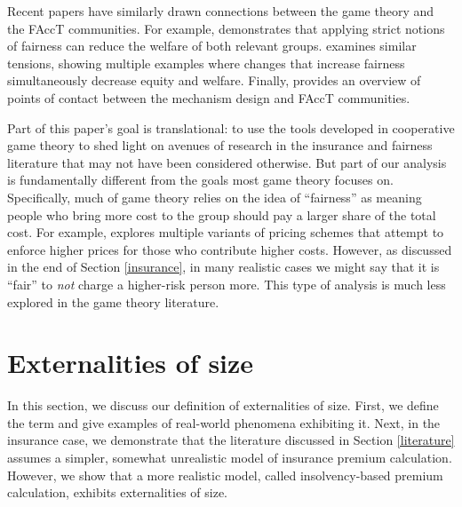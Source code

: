 \documentclass[sigconf]{acmart}
\begin{document}
Recent papers have similarly drawn connections between the game theory and the FAccT communities. For example, \citet{hu2020fair} demonstrates that applying strict notions of fairness can reduce the welfare of both relevant groups. \citet{kasy2020fairness} examines similar tensions, showing multiple examples where changes that increase fairness simultaneously decrease equity and welfare. Finally, \citet{finocchiarofairness} provides an overview of points of contact between the mechanism design and FAccT communities. 

Part of this paper's goal is translational: to use the tools developed in cooperative game theory to shed light on avenues of research in the insurance and fairness literature that may not have been considered otherwise. But part of our analysis is fundamentally different from the goals most game theory focuses on. Specifically, much of game theory relies on the idea of \enquote{fairness} as meaning people who bring more cost to the group should pay a larger share of the total cost. For example, \citet{elastic} explores multiple variants of pricing schemes that attempt to enforce higher prices for those who contribute higher costs. However, as discussed in the end of Section \ref{insurance}, in many realistic cases we might say that it is \enquote{fair} to \emph{not} charge a higher-risk person more. This type of analysis is much less explored in the game theory literature.

\section{Externalities of size}\label{exsize}
In this section, we discuss our definition of externalities of size. First, we define the term and give examples of real-world phenomena exhibiting it. Next, in the insurance case, we demonstrate that the literature discussed in Section \ref{literature} assumes a simpler, somewhat unrealistic model of insurance premium calculation. However, we show that a more realistic model, called insolvency-based premium calculation, exhibits externalities of size.  
\end{document}
